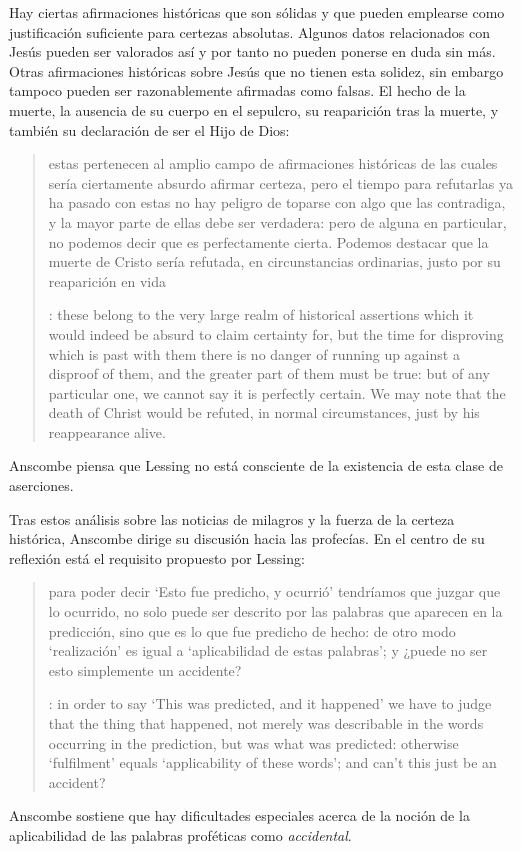 Hay ciertas afirmaciones históricas que son sólidas y que pueden emplearse como
justificación suficiente para certezas absolutas. Algunos datos relacionados con
Jesús pueden ser valorados así y por tanto no pueden ponerse en duda sin más.
Otras afirmaciones históricas sobre Jesús que no tienen esta solidez, sin
embargo tampoco pueden ser razonablemente afirmadas como falsas. El hecho de la
muerte, la ausencia de su cuerpo en el sepulcro, su reaparición tras la muerte,
y también su declaración de ser el Hijo de Dios:
\blockquote[{\cite[28]{anscombe2008faith:prophandmi}}: these belong to the very
large realm of historical assertions which it would indeed be absurd to claim
certainty for, but the time for disproving which is past \textelp{} with them
there is no danger of running up against a disproof of them, and the greater
part of them must be true: but of any particular one, we cannot say it is
perfectly certain. We may note that the death of Christ would be refuted, in
normal circumstances, just by his reappearance alive.]{estas pertenecen al
  amplio campo de afirmaciones históricas de las cuales sería ciertamente
  absurdo afirmar certeza, pero el tiempo para refutarlas ya ha pasado
  \textelp{} con estas no hay peligro de toparse con algo que las contradiga, y
  la mayor parte de ellas debe ser verdadera: pero de alguna en particular, no
  podemos decir que es perfectamente cierta. Podemos destacar que la muerte de
  Cristo sería refutada, en circunstancias ordinarias, justo por su reaparición
  en vida}. Anscombe piensa que Lessing no está consciente de la existencia de
esta clase de aserciones.

Tras estos análisis sobre las noticias de milagros y la fuerza de la certeza
histórica, Anscombe dirige su discusión hacia las profecías. En el centro de su
reflexión está el requisito propuesto por Lessing:
\blockquote[{\cite[29]{anscombe2008faith:prophandmi}}: in order to say `This was
predicted, and it happened' we have to judge that the thing that happened, not
merely was describable in the words occurring in the prediction, but was what
was predicted: otherwise `fulfilment' equals `applicability of these words'; and
can't this just be an accident?]{para poder decir `Esto fue predicho, y ocurrió'
  tendríamos que juzgar que lo ocurrido, no solo puede ser descrito por las
  palabras que aparecen en la predicción, sino que es lo que fue predicho de
  hecho: de otro modo `realización' es igual a `aplicabilidad de estas
  palabras'; y ¿puede no ser esto simplemente un accidente?}
Anscombe sostiene que hay dificultades especiales acerca de la noción de la
aplicabilidad de las palabras proféticas como \emph{accidental}.

